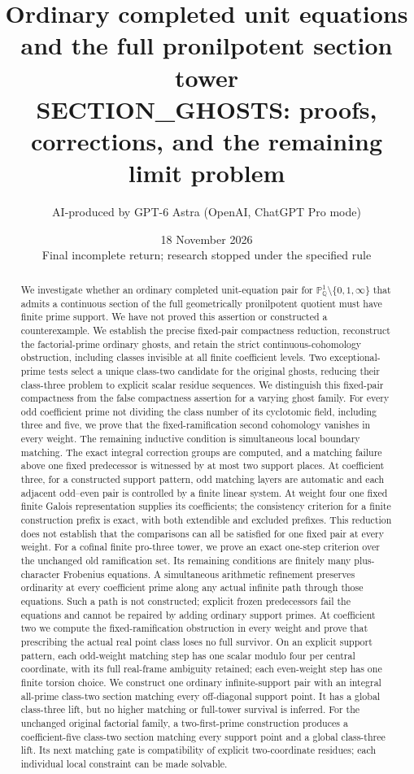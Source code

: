\documentclass[11pt,a4paper]{article}
\title{Ordinary completed unit equations and the full pronilpotent section tower\\[5pt]
\large SECTION\_GHOSTS: proofs, corrections, and the remaining limit problem}
\author{AI-produced by GPT-6 Astra (OpenAI, ChatGPT Pro mode)}
\date{18 November 2026\\\small Final incomplete return; research stopped under the specified rule}
\begin{document}
\maketitle
\begin{abstract}
We investigate whether an ordinary completed unit-equation pair for
\(\mathbb P^1_{\mathbb Q}\setminus\{0,1,\infty\}\) that admits a continuous
section of the full geometrically pronilpotent quotient must have finite
prime support. We have not proved this assertion or constructed a
counterexample. We establish the precise fixed-pair compactness reduction,
reconstruct the factorial-prime ordinary ghosts, and retain the strict
continuous-cohomology obstruction, including classes invisible at all
finite coefficient levels. Two exceptional-prime tests select a unique
class-two candidate for the original ghosts, reducing their class-three
problem to explicit scalar residue sequences. We distinguish this fixed-pair
compactness from the false compactness assertion for a varying ghost family.
For every odd coefficient prime not dividing the class number of its
cyclotomic field, including three and five, we prove that the
fixed-ramification second cohomology vanishes in every weight.
The remaining inductive condition is simultaneous local boundary matching.
The exact integral correction groups are computed, and a matching failure
above one fixed predecessor is witnessed by at most two support places.
At coefficient three, for a constructed support pattern,
odd matching layers are automatic and each adjacent odd--even pair is
controlled by a finite linear system. At weight four one fixed finite
Galois representation supplies its coefficients; the consistency criterion
for a finite construction prefix is exact, with both extendible and
excluded prefixes. This reduction does not establish that the comparisons
can all be satisfied for one fixed pair at every weight.
For a cofinal finite pro-three tower, we prove an exact one-step
criterion over the unchanged old ramification set. Its remaining
conditions are finitely many plus-character Frobenius equations.
A simultaneous arithmetic refinement preserves ordinarity at every
coefficient prime along any actual infinite path through those
equations. Such a path is not constructed; explicit frozen
predecessors fail the equations and cannot be repaired by adding
ordinary support primes.
At coefficient two we compute the fixed-ramification obstruction
in every weight and prove that prescribing the actual real point
class loses no full survivor. On an explicit support pattern,
each odd-weight matching step has one scalar modulo four per
central coordinate, with its full real-frame ambiguity retained;
each even-weight step has one finite torsion choice.
We construct one ordinary infinite-support pair with an integral
all-prime class-two section matching every off-diagonal support
point. It has a global class-three lift, but no higher matching
or full-tower survival is inferred.
For the unchanged original factorial family, a two-first-prime
construction produces a coefficient-five class-two section matching
every support point and a global class-three lift. Its next matching
gate is compatibility of explicit two-coordinate residues; each
individual local constraint can be made solvable.


\end{abstract}
\end{document}

